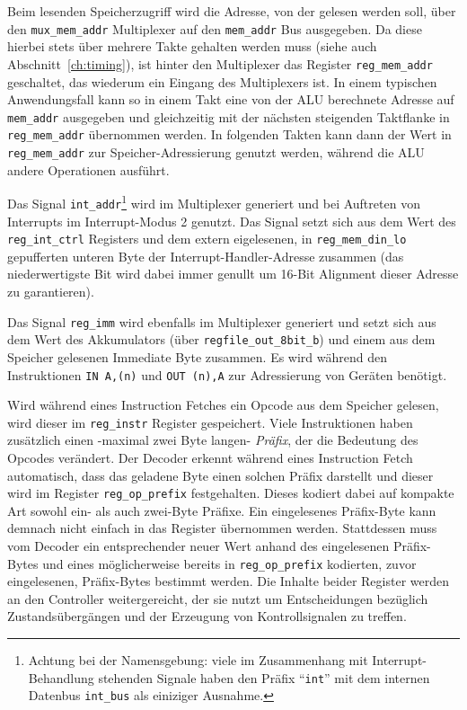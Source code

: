 \documentclass[ngerman, cd=lightcolor]{tudscrreprt}
\begin{document}
Beim lesenden Speicherzugriff wird die Adresse, von der gelesen werden soll, über
den \texttt{mux\_mem\_addr} Multiplexer auf den \texttt{mem\_addr} Bus
ausgegeben. Da diese hierbei stets über mehrere Takte gehalten werden muss
(siehe auch Abschnitt~\ref{ch:timing}), ist hinter den Multiplexer das Register
\texttt{reg\_mem\_addr} geschaltet, das wiederum ein Eingang des Multiplexers
ist. In einem typischen Anwendungsfall kann so in einem Takt eine von der ALU
berechnete Adresse auf \texttt{mem\_addr} ausgegeben und gleichzeitig mit der
nächsten steigenden Taktflanke in \texttt{reg\_mem\_addr} übernommen werden. In
folgenden Takten kann dann der Wert in \texttt{reg\_mem\_addr} zur
Speicher-Adressierung genutzt werden, während die ALU andere Operationen
ausführt.

Das Signal \texttt{int\_addr}\footnote{Achtung bei der Namensgebung: viele im
Zusammenhang mit Interrupt-Behandlung stehenden Signale haben den Präfix
``\texttt{int}'' mit dem internen Datenbus \texttt{int\_bus} als einiziger
Ausnahme.} wird im Multiplexer generiert und bei Auftreten von Interrupts im
Interrupt-Modus 2 genutzt. Das Signal setzt sich aus dem Wert des
\texttt{reg\_int\_ctrl} Registers und dem extern eigelesenen, in
\texttt{reg\_mem\_din\_lo} gepufferten unteren Byte der
Interrupt-Handler-Adresse zusammen (das niederwertigste Bit wird dabei immer
genullt um 16-Bit Alignment dieser Adresse zu garantieren).

Das Signal \texttt{reg\_imm} wird ebenfalls im Multiplexer generiert und setzt
sich aus dem Wert des Akkumulators (über \texttt{regfile\_out\_8bit\_b}) und
einem aus dem Speicher gelesenen Immediate Byte zusammen. Es wird während den
Instruktionen \texttt{IN A,(n)} und \texttt{OUT (n),A} zur Adressierung von
Geräten benötigt.

Wird während eines Instruction Fetches ein Opcode aus dem Speicher gelesen,
wird dieser im \texttt{reg\_instr} Register gespeichert. Viele Instruktionen
haben zusätzlich einen -maximal zwei Byte langen- \textit{Präfix}, der die
Bedeutung des Opcodes verändert. Der Decoder erkennt während eines
Instruction Fetch automatisch, dass das geladene Byte einen solchen Präfix
darstellt und dieser wird im Register \texttt{reg\_op\_prefix} festgehalten.
Dieses kodiert dabei auf kompakte Art sowohl ein- als auch zwei-Byte Präfixe.
Ein eingelesenes Präfix-Byte kann demnach nicht einfach in das Register
übernommen werden.  Stattdessen muss vom Decoder ein entsprechender neuer Wert
anhand des eingelesenen Präfix-Bytes und eines möglicherweise bereits in
\texttt{reg\_op\_prefix} kodierten, zuvor eingelesenen, Präfix-Bytes bestimmt
werden.  Die Inhalte beider Register werden an den Controller weitergereicht,
der sie nutzt um Entscheidungen bezüglich Zustandsübergängen und der Erzeugung
von Kontrollsignalen zu treffen.
\end{document}
